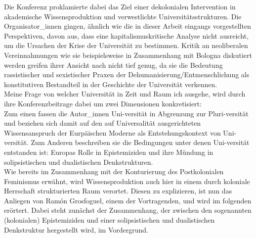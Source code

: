 \noindent Die Konferenz proklamierte dabei das Ziel einer dekolonialen
Intervention in akademische Wissensproduktion und verwestlichte
Universitätsstrukturen. Die Organisator\_innen gingen, ähnlich wie die in dieser
Arbeit eingangs vorgestellten Perspektiven, davon aus, dass eine
kapitalismuskritische Analyse nicht ausreicht, um die Ursachen der Krise der
Universität zu bestimmen. Kritik an neoliberalen Vereinnahmungen wie sie
beispielsweise in Zusammenhang mit Bologna diskutiert werden\footnotemark
{} greifen ihrer
Ansicht nach nicht tief genug, da sie die Bedeutung rassistischer und
sexistischer Praxen der Dehumanisierung/Entmenschlichung als konstitutiven
Bestandteil in der Geschichte der Universität verkennen.\\

\noindent Meine Frage von
welcher Universität in Zeit und Raum ich ausgehe, wird durch ihre
Konferenzbeitrage dabei um zwei Dimensionen konkretisiert:\\
 Zum einen fassen die
Autor\_innen Uni-versität in Abgrenzung zur Pluri-versität und beziehen sich
damit auf den auf Universalität ausgerichteten Wissensanspruch der Eurpäischen
Moderne als Entstehungskontext von Uni-versität. Zum Anderen beschreiben sie
die Bedingungen unter denen Uni-versität entstanden ist: Europas Rolle in
Epistemiziden und ihre Mündung in solipsistischen und dualistischen
Denkstrukturen. \\
Wie bereits im Zusammenhang mit der Konturierung des
Postkolonialen Feminismus erwähnt, wird Wissensproduktion auch hier in einem
durch koloniale Herrschaft strukturierten Raum verortet. Diesen zu explizieren,
ist nun das Anliegen von Ramón Grosfoguel, einem der Vortragenden, und wird im
folgenden erörtert.\footnotemark {} Dabei steht zunächst der Zusammenhang, der zwischen
den sogenannten (kolonialen) Epistemiziden und einer solipsistischen und
dualistischen Denkstruktur hergestellt wird, im Vordergrund.\\ 

